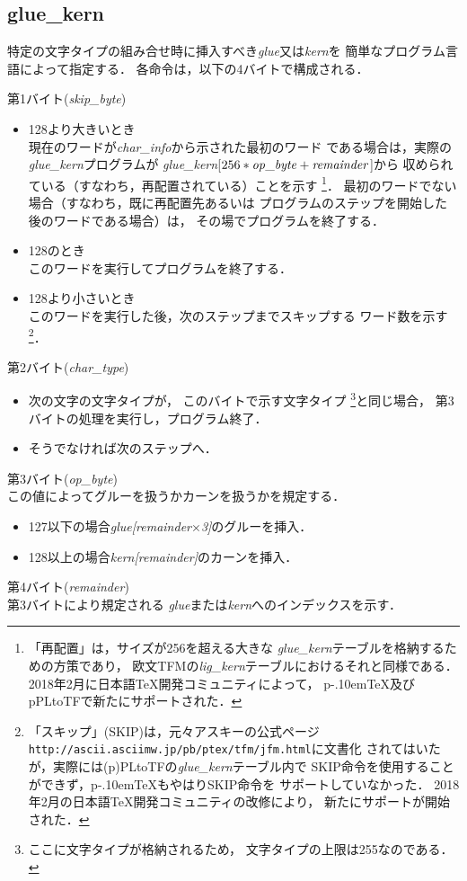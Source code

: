\documentclass[a4paper,11pt,nomag]{jsarticle}
\def\pTeX{p\kern-.10em\TeX}\def\upTeX{u\pTeX}
\begin{document}
\subsection{glue\_kern}
特定の文字タイプの組み合せ時に挿入すべき{\it glue}又は{\it kern}を
簡単なプログラム言語によって指定する．
各命令は，以下の4バイトで構成される．
\begin{description}
\item{第1バイト({\it skip\_byte})}
	\begin{itemize}
	\item 128より大きいとき\\
		現在のワードが{\it char\_info}から示された最初のワード
		である場合は，実際の{\it glue\_kern}プログラムが
		{\it glue\_kern}[$256*{\it op\_byte}+{\it remainder}$]から
		収められている（すなわち，再配置されている）ことを示す
		\footnote{「再配置」は，サイズが256を超える大きな
		{\it glue\_kern}テーブルを格納するための方策であり，
		欧文TFMの{\it lig\_kern}テーブルにおけるそれと同様である．
		2018年2月に日本語\TeX{}開発コミュニティによって，
		\pTeX{}及びpPLtoTFで新たにサポートされた．}．
		最初のワードでない場合（すなわち，既に再配置先あるいは
		プログラムのステップを開始した後のワードである場合）は，
		その場でプログラムを終了する．
	\item 128のとき\\
		このワードを実行してプログラムを終了する．
	\item 128より小さいとき\\
		このワードを実行した後，次のステップまでスキップする
		ワード数を示す
		\footnote{「スキップ」(SKIP)は，元々アスキーの公式ページ
		{\tt http://ascii.asciimw.jp/pb/ptex/tfm/jfm.html}に文書化
		されてはいたが，実際には(p)PLtoTFの{\it glue\_kern}テーブル内で
		SKIP命令を使用することができず，\pTeX{}もやはりSKIP命令を
		サポートしていなかった．
		2018年2月の日本語\TeX{}開発コミュニティの改修により，
		新たにサポートが開始された．}．
	\end{itemize}
\item{第2バイト({\it char\_type})}
	\begin{itemize}
	\item 次の文字の文字タイプが，
		このバイトで示す文字タイプ
		\footnote{ここに文字タイプが格納されるため，
		文字タイプの上限は255なのである．}と同じ場合，
		第3バイトの処理を実行し，プログラム終了．
	\item そうでなければ次のステップへ．
	\end{itemize}
\item{第3バイト({\it op\_byte})}\\
	この値によってグルーを扱うかカーンを扱うかを規定する．
	\begin{itemize}
	\item 127以下の場合{\it glue[remainder$\times$3]}のグルーを挿入．
	\item 128以上の場合{\it kern[remainder]}のカーンを挿入．
	\end{itemize}
\item{第4バイト({\it remainder})}\\
	第3バイトにより規定される
	{\it glue}または{\it kern}へのインデックスを示す．
\end{description}
%
\end{document}
